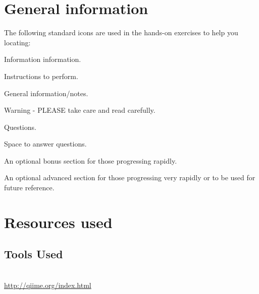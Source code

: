\documentclass[a4paper,12pt,twoside]{memoir}
\begin{document}
%
%
\workshoptitlepage

\section{General information}

The following standard icons are used in the hands-on exercises to help you locating:

\begin{information}
Information information.
\end{information}

\begin{steps}
Instructions to perform.
\end{steps}

\begin{note}
General information/notes.
\end{note}

\begin{warning}
Warning - PLEASE take care and read carefully.
\end{warning}

\begin{questions}
Questions.
\begin{answer}
Space to answer questions.
\end{answer}
\end{questions}

\begin{bonus}
An optional bonus section for those progressing rapidly.
\end{bonus}

\begin{advanced}
An optional advanced section for those progressing very rapidly or to be used for future reference.
\end{advanced}

\section{Resources used}

\subsection{Tools Used}

\begin{description}[style=multiline,labelindent=0cm,align=left,leftmargin=0.5cm]
  \item[QIIME]\hfill\\
     \url{http://qiime.org/index.html}
\end{description}
\end{document}
